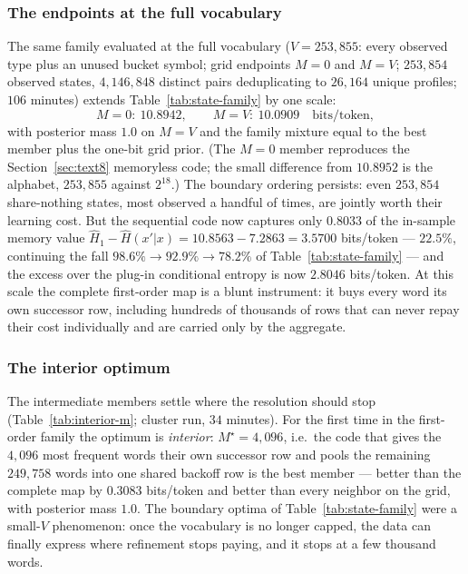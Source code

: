 \documentclass[11pt]{article}
\begin{document}
\subsubsection*{The endpoints at the full vocabulary}
\label{sec:state-family-endpoints}
The same family evaluated at the full vocabulary
($V = 253{,}855$: every observed type plus an unused bucket symbol;
grid endpoints $M = 0$ and $M = V$; $253{,}854$ observed states,
$4{,}146{,}848$ distinct pairs deduplicating to $26{,}164$ unique
profiles; $106$ minutes) extends Table~\ref{tab:state-family} by one
scale:
\[
  M{=}0:\ 10.8942, \qquad M{=}V:\ \mathbf{10.0909}
  \quad\text{bits/token},
\]
with posterior mass $1.0$ on $M = V$ and the family mixture equal to
the best member plus the one-bit grid prior.  (The $M{=}0$ member
reproduces the Section~\ref{sec:text8} memoryless code; the small
difference from $10.8952$ is the alphabet, $253{,}855$ against
$2^{18}$.)  The boundary ordering persists: even $253{,}854$
share-nothing states, most observed a handful of times, are jointly
worth their learning cost.  But the sequential code now captures only
$0.8033$ of the in-sample memory value
$\hat H_1 - \hat H(x'|x) = 10.8563 - 7.2863 = 3.5700$ bits/token ---
$22.5\%$, continuing the fall $98.6\% \to 92.9\% \to 78.2\%$ of
Table~\ref{tab:state-family} --- and the excess over the plug-in
conditional entropy is now $2.8046$ bits/token.  At this scale the
complete first-order map is a blunt instrument: it buys every word its
own successor row, including hundreds of thousands of rows that can
never repay their cost individually and are carried only by the
aggregate.

\subsubsection*{The interior optimum}
The intermediate members settle where the resolution should stop
(Table~\ref{tab:interior-m}; cluster run, $34$ minutes).  For the
first time in the first-order family the optimum is \emph{interior}:
$M^\star = 4{,}096$, i.e.\ the code that gives the $4{,}096$ most
frequent words their own successor row and pools the remaining
$249{,}758$ words into one shared backoff row is the best member ---
better than the complete map by $0.3083$ bits/token and better than
every neighbor on the grid, with posterior mass $1.0$.  The boundary
optima of Table~\ref{tab:state-family} were a small-$V$ phenomenon:
once the vocabulary is no longer capped, the data can finally express
where refinement stops paying, and it stops at a few thousand words.
\end{document}
